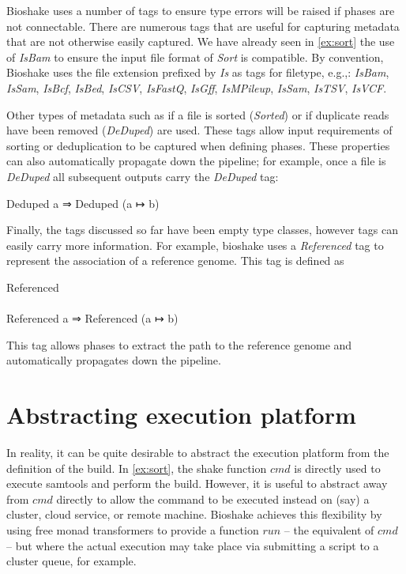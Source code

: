 \documentclass{article}
\begin{document}
Bioshake uses a number of tags to ensure type errors will be raised if phases
are not connectable. There are numerous tags that are useful for capturing
metadata that are not otherwise easily captured. We have already seen in
\cref{ex:sort} the use of \textit{IsBam} to ensure the input file format of
\textit{Sort} is compatible. By convention, Bioshake uses the file extension
prefixed by \textit{Is} as tags for filetype, e.g.,: \textit{IsBam},
\textit{IsSam}, \textit{IsBcf}, \textit{IsBed}, \textit{IsCSV},
\textit{IsFastQ}, \textit{IsGff}, \textit{IsMPileup}, \textit{IsSam},
\textit{IsTSV}, \textit{IsVCF}.

Other types of metadata such as if a file is sorted (\textit{Sorted}) or if
duplicate reads have been removed (\textit{DeDuped}) are used. These tags allow
input requirements of sorting or deduplication to be captured when defining
phases. These properties can also automatically propagate down the pipeline; for
example, once a file is \textit{DeDuped} all subsequent outputs carry the
\textit{DeDuped} tag:
\begin{haskell*}
   Deduped a ⇒ Deduped (a ↦ b)
\end{haskell*}

Finally, the tags discussed so far have been empty type classes, however tags
can easily carry more information. For example, bioshake uses a
\textit{Referenced} tag to represent the association of a reference genome. This
tag is defined as
\begin{haskell*}
   Referenced \\\\
   Referenced a ⇒ Referenced (a ↦ b)
\end{haskell*}
This tag allows phases to extract the path to the reference genome and
automatically propagates down the pipeline.

\section{Abstracting execution platform}

In reality, it can be quite desirable to abstract the execution platform from
the definition of the build. In \cref{ex:sort}, the shake function $cmd$ is
directly used to execute samtools and perform the build. However, it is useful
to abstract away from $cmd$ directly to allow the command to be executed instead
on (say) a cluster, cloud service, or remote machine. Bioshake achieves this
flexibility by using free monad transformers to provide a function $run$ -- the
equivalent of $cmd$ -- but where the actual execution may take place via
submitting a script to a cluster queue, for example.
\end{document}
